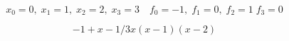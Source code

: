 \[ x_0=0, \; x_1=1, \; x_2=2, \; x_3=3 \quad f_0=-1, \; f_1=0, \; f_2=1 \; f_3=0 \]


\[ -1+x-1/3 x(x-1)(x-2) \]
